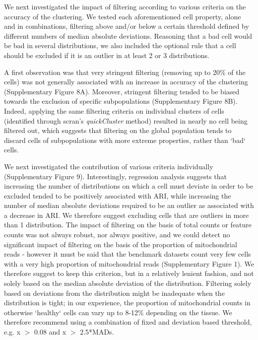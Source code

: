 \documentclass{bmcart}
\begin{document}
We next investigated the impact of filtering according to various criteria on the accuracy of the clustering. We tested each aforementioned cell property, alone and in combinations, filtering above and/or below a certain threshold defined by different numbers of median absolute deviations. Reasoning that a bad cell would be bad in several distributions, we also included the optional rule that a cell should be excluded if it is an outlier in at least 2 or 3 distributions.

A first observation was that very stringent filtering (removing up to 20\% of the cells) was not generally associated with an increase in accuracy of the clustering (Supplementary Figure 8A). Moreover, stringent filtering tended to be biased towards the exclusion of specific subpopulations (Supplementary Figure 8B). Indeed, applying the same filtering criteria on individual clusters of cells (identified through scran's \textit{quickCluster} method) resulted in nearly no cell being filtered out, which suggests that filtering on the global population tends to discard cells of subpopulations with more extreme properties, rather than `bad` cells.

We next investigated the contribution of various criteria individually (Supplementary Figure 9). Interestingly, regression analysis suggests that increasing the number of distributions on which a cell must deviate in order to be excluded tended to be positively associated with ARI, while increasing the number of median absolute deviations required to be an outlier as associated with a decrease in ARI. We therefore suggest excluding cells that are outliers in more than 1 distribution. The impact of filtering on the basis of total counts or feature counts was not always robust, nor always positive, and we could detect no significant impact of filtering on the basis of the proportion of mitochondrial reads - however it must be said that the benchmark datasets count very few cells with a very high proportion of mitochondrial reads (Supplementary Figure 1). We therefore suggest to keep this criterion, but in a relatively lenient fashion, and not solely based on the median absolute deviation of the distribution. Filtering solely based on deviations from the distribution might be inadequate when the distribution is tight; in our experience, the proportion of mitochondrial counts in otherwise `healthy` cells can vary up to 8-12\% depending on the tissue. We therefore recommend using a combination of fixed and deviation based threshold, e.g. x $>$ 0.08 and x $>$ 2.5*MADs.
\end{document}
